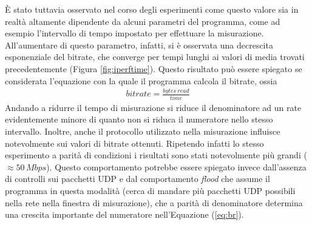 \documentclass[a4paper,10pt]{article}
\begin{document}
\noindent
È stato tuttavia osservato nel corso degli esperimenti come questo valore sia in realtà altamente dipendente da alcuni parametri del programma, come ad esempio l'intervallo di tempo impostato per effettuare la misurazione. All'aumentare di questo parametro, infatti, si è osservata una decrescita esponenziale del bitrate, che converge per tempi lunghi ai valori di media trovati precedentemente (Figura \ref{fig:iperftime}). Questo risultato può essere spiegato se considerata l'equazione con la quale il programma calcola il bitrate, ossia
\begin{align}
\label{eq:br}
bitrate = \frac{bytes \ read}{time}
\end{align}
Andando a ridurre il tempo di misurazione si riduce il denominatore ad un rate evidentemente minore di quanto non si riduca il numeratore nello stesso intervallo. Inoltre, anche il protocollo utilizzato nella misurazione influisce notevolmente sui valori di bitrate ottenuti. Ripetendo infatti lo stesso esperimento a parità di condizioni i risultati sono stati notevolmente più grandi ($\approx 50\,Mbps$). Questo comportamento potrebbe essere spiegato invece dall'assenza di controlli sui pacchetti UDP e dal comportamento \textit{flood} che assume il programma in questa modalità (cerca di mandare più pacchetti UDP possibili nella rete nella finestra di misurazione), che a parità di denominatore determina una crescita importante del numeratore nell'Equazione (\ref{eq:br}).
\end{document}
